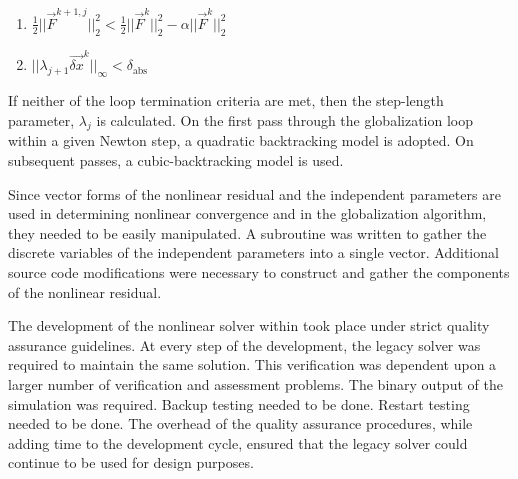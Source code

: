 \begin{enumerate}
\item{$\frac{1}{2}||\vec{F}^{k+1, j}||^{2}_{2} < \frac{1}{2}||\vec{F}^{k}||^{2}_{2} - \alpha ||\vec{F}^{k}||^{2}_{2}$ }
\item{$||\lambda_{j+1} \vec{\delta x}^{k}||_{\infty} < \delta_{\text{abs}}$}
\end{enumerate}

If neither of the loop termination criteria are met, then the step-length parameter, $\lambda_j$ is calculated.
On the first pass through the globalization loop within a given Newton step, a quadratic backtracking model is adopted.
On subsequent passes, a cubic-backtracking model is used.
 
Since vector forms of the nonlinear residual and the independent parameters are used in determining nonlinear convergence and in the globalization algorithm, they needed to be easily manipulated.
A subroutine was written to gather the discrete variables of the independent parameters into a single vector.
Additional source code modifications were necessary to construct and gather the components of the nonlinear residual.

The development of the nonlinear solver within \cobra{} took place under strict quality assurance guidelines.
At every step of the development, the legacy solver was required to maintain the same solution.
This verification was dependent upon a larger number of verification and assessment problems.
The binary output of the simulation was required.
Backup testing needed to be done.
Restart testing needed to be done.
The overhead of the quality assurance procedures, while adding time to the development cycle, ensured that the legacy solver could continue to be used for design purposes.


